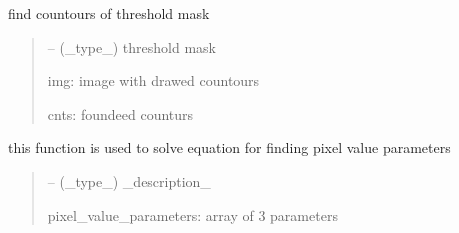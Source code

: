 \documentclass[letterpaper,10pt,english]{sphinxmanual}
\begin{document}
\begin{savenotes}
\begin{fulllineitems}

\begin{savenotes}\begin{fulllineitems}
\label{\detokenize{setting/backend/pxvalue_calibration:oxin.backend.pxvalue_calibration.extract_info.find_contours}}
\pysigstartsignatures
{}
\pysigstopsignatures
\sphinxAtStartPar
find countours of threshold mask
\begin{quote}\begin{description}
\sphinxAtStartPar
{} – (\_type\_) threshold mask

\sphinxAtStartPar
img: image with drawed countours

\sphinxAtStartPar
cnts: foundeed counturs

\end{description}\end{quote}

\end{fulllineitems}\end{savenotes}


\begin{savenotes}\begin{fulllineitems}
\label{\detokenize{setting/backend/pxvalue_calibration:oxin.backend.pxvalue_calibration.extract_info.solve_equation}}
\pysigstartsignatures
{}
\pysigstopsignatures
\sphinxAtStartPar
this function is used to solve equation for finding pixel value parameters
\begin{quote}\begin{description}
\sphinxAtStartPar
{} – (\_type\_) \_description\_

\sphinxAtStartPar
pixel\_value\_parameters: array of 3 parameters

\end{description}\end{quote}


\end{fulllineitems}
\end{savenotes}
\end{fulllineitems}
\end{savenotes}
\end{document}
